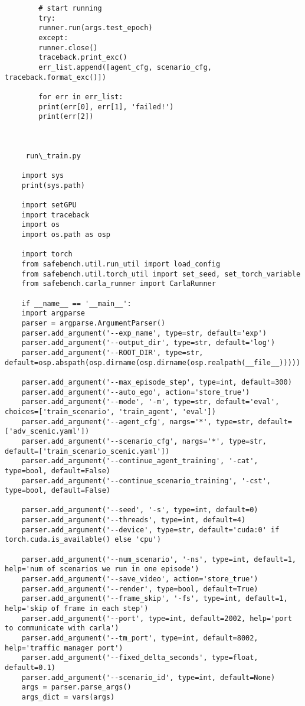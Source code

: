 \begin{lstlisting}
		# start running
		try:
		runner.run(args.test_epoch)
		except:
		runner.close()
		traceback.print_exc()
		err_list.append([agent_cfg, scenario_cfg, traceback.format_exc()])
		
		for err in err_list:
		print(err[0], err[1], 'failed!')
		print(err[2])
		


     run\_train.py

	import sys
	print(sys.path)
	
	import setGPU
	import traceback
	import os
	import os.path as osp
	
	import torch 
	from safebench.util.run_util import load_config
	from safebench.util.torch_util import set_seed, set_torch_variable
	from safebench.carla_runner import CarlaRunner
	
	if __name__ == '__main__':
	import argparse
	parser = argparse.ArgumentParser()
	parser.add_argument('--exp_name', type=str, default='exp')
	parser.add_argument('--output_dir', type=str, default='log')
	parser.add_argument('--ROOT_DIR', type=str, default=osp.abspath(osp.dirname(osp.dirname(osp.realpath(__file__)))))
	
	parser.add_argument('--max_episode_step', type=int, default=300)
	parser.add_argument('--auto_ego', action='store_true')
	parser.add_argument('--mode', '-m', type=str, default='eval', choices=['train_scenario', 'train_agent', 'eval'])
	parser.add_argument('--agent_cfg', nargs='*', type=str, default=['adv_scenic.yaml'])
	parser.add_argument('--scenario_cfg', nargs='*', type=str, default=['train_scenario_scenic.yaml'])
	parser.add_argument('--continue_agent_training', '-cat', type=bool, default=False)
	parser.add_argument('--continue_scenario_training', '-cst', type=bool, default=False)
	
	parser.add_argument('--seed', '-s', type=int, default=0)
	parser.add_argument('--threads', type=int, default=4)
	parser.add_argument('--device', type=str, default='cuda:0' if torch.cuda.is_available() else 'cpu')   
	
	parser.add_argument('--num_scenario', '-ns', type=int, default=1, help='num of scenarios we run in one episode')
	parser.add_argument('--save_video', action='store_true')
	parser.add_argument('--render', type=bool, default=True)
	parser.add_argument('--frame_skip', '-fs', type=int, default=1, help='skip of frame in each step')
	parser.add_argument('--port', type=int, default=2002, help='port to communicate with carla')
	parser.add_argument('--tm_port', type=int, default=8002, help='traffic manager port')
	parser.add_argument('--fixed_delta_seconds', type=float, default=0.1)
	parser.add_argument('--scenario_id', type=int, default=None)
	args = parser.parse_args()
	args_dict = vars(args)
	

\end{lstlisting}
